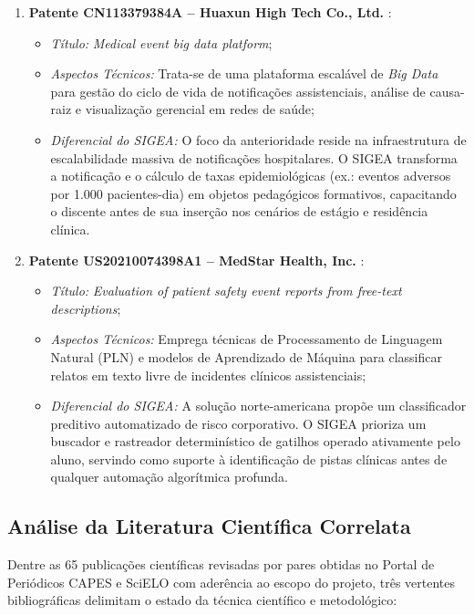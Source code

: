\begin{enumerate}
    \item \textbf{Patente CN113379384A -- Huaxun High Tech Co., Ltd.} \cite{patente_cn113379384}:
    \begin{itemize}
        \item \textit{Título:} \textit{Medical event big data platform};
        \item \textit{Aspectos Técnicos:} Trata-se de uma plataforma escalável de \textit{Big Data} para gestão do ciclo de vida de notificações assistenciais, análise de causa-raiz e visualização gerencial em redes de saúde;
        \item \textit{Diferencial do SIGEA:} O foco da anterioridade reside na infraestrutura de escalabilidade massiva de notificações hospitalares. O SIGEA transforma a notificação e o cálculo de taxas epidemiológicas (ex.: eventos adversos por 1.000 pacientes-dia) em objetos pedagógicos formativos, capacitando o discente antes de sua inserção nos cenários de estágio e residência clínica.
    \end{itemize}

    \item \textbf{Patente US20210074398A1 -- MedStar Health, Inc.} \cite{patente_us20210074398}:
    \begin{itemize}
        \item \textit{Título:} \textit{Evaluation of patient safety event reports from free-text descriptions};
        \item \textit{Aspectos Técnicos:} Emprega técnicas de Processamento de Linguagem Natural (PLN) e modelos de Aprendizado de Máquina para classificar relatos em texto livre de incidentes clínicos assistenciais;
        \item \textit{Diferencial do SIGEA:} A solução norte-americana propõe um classificador preditivo automatizado de risco corporativo. O SIGEA prioriza um buscador e rastreador determinístico de gatilhos operado ativamente pelo aluno, servindo como suporte à identificação de pistas clínicas antes de qualquer automação algorítmica profunda.
    \end{itemize}
\end{enumerate}

\subsection{Análise da Literatura Científica Correlata}
\label{subsec:analise-literatura-correlata}

Dentre as 65 publicações científicas revisadas por pares obtidas no Portal de Periódicos CAPES e SciELO com aderência ao escopo do projeto, três vertentes bibliográficas delimitam o estado da técnica científico e metodológico:

